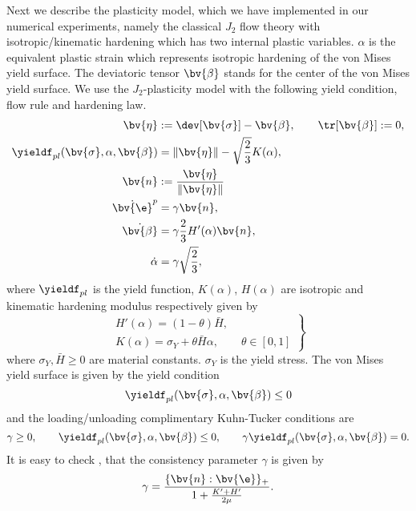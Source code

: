 Next we describe the plasticity model, which we have implemented in our numerical experiments, namely the classical $J_2$ flow theory with isotropic/kinematic hardening \cite[2.3.2]{SiHu98} which has two internal plastic variables. $\alpha$ is the equivalent plastic strain which represents isotropic hardening of the von Mises yield surface. The deviatoric tensor $\bv{\beta}$ stands for the center of the von Mises yield surface. We use the $J_2$-plasticity model with the following yield condition, flow rule and hardening law.
\begin{align}
\bv{\eta} &:= \dev [\bv{\sigma}] - \bv{\beta}, \qquad \tr[\bv{\beta}] := 0, \nonumber \\
\yieldf_{pl}(\bv{\sigma}, \alpha, \bv{\beta}) &= \|\bv{\eta}\| - \sqrt{\dfrac{2}{3}} K(\alpha), \nonumber \\
\bv{n} &:= \dfrac{\bv{\eta}}{\|\bv{\eta}\|} \nonumber \\
\dot{\bv{\e}}^p &= \gamma \bv{n}, \label{constPL} \\
 \dot{\bv{\beta}} &= \gamma \dfrac{2}{3} H'(\alpha) \bv{n}, \nonumber \\
 \dot \alpha &= \gamma \sqrt{\dfrac{2}{3}}, \nonumber
\end{align}
where $\yieldf_{pl}$ is the yield function, $K(\alpha)$, $H(\alpha)$ are isotropic and kinematic hardening modulus respectively given by
\begin{equation} \label{KHdef}
\left.\begin{array}{c}
H'(\alpha) = (1 - \theta) \bar H, \\
K(\alpha) = \sigma_Y + \theta \bar H \alpha, \qquad \theta \in [0,1]
\end{array}\right\rbrace 
\end{equation}
where $\sigma_Y, \bar H \geq 0$ are material constants. $\sigma_Y$ is the yield stress.
The von Mises yield surface is given by the yield condition 
\begin{equation}\nonumber
\yieldf_{pl}(\bv{\sigma}, \alpha, \bv{\beta}) \leq 0
\end{equation}
and the loading/unloading complimentary Kuhn-Tucker conditions are
\[
\gamma \geq 0, 
\qquad \yieldf_{pl}(\bv{\sigma}, \alpha, \bv{\beta}) \leq 0,
\qquad \gamma \yieldf_{pl}(\bv{\sigma}, \alpha, \bv{\beta}) = 0.
\]
It is easy to check \cite[2.2.18]{SiHu98}, that the consistency parameter $\gamma$ is given by
\begin{align*}
\gamma= \dfrac{\{\bv{n} : \bv{\e}\}_{+}}{1+ \frac{K'+H'}{2\mu}}.
\end{align*}
